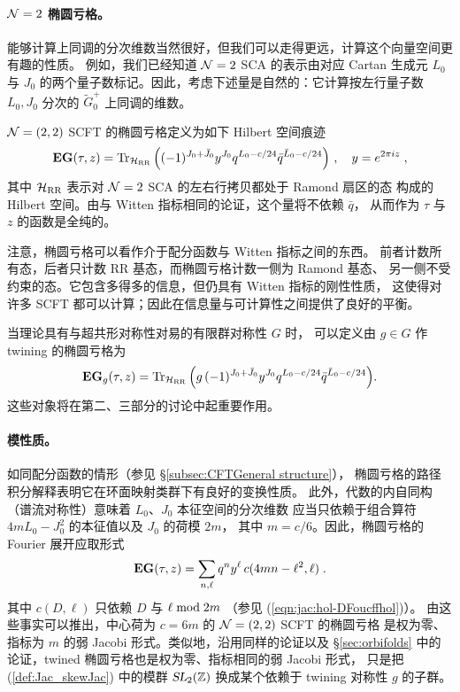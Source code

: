 \documentclass[11pt,a4paper,fontset=windows]{ctexart}
\numberwithin{equation}{section}
\newcommand{\SL}{\operatorname{\textsl{SL}}}      %
\newcommand{\myparagraph}[1]{\paragraph{#1}\mbox\\}
\newcommand{\ZZ}{\mathbb{Z}}
\newcommand{\xmod}{{\rm \;mod\;}}
\def\p{\pi}
\def\t{\tau}
\def\til{\tilde}
\def\Tr{\tr}
\newcommand{\tr}{\operatorname{Tr}}
\newcommand{\be}{\begin{equation}}
\newcommand{\ee}{\end{equation}}
\newcommand{\eq}[1]{(\ref{#1})}
\begin{document}
\myparagraph{${\cal N}=2$ 椭圆亏格。}
能够计算上同调的分次维数当然很好，但我们可以走得更远，计算这个向量空间更有趣的性质。
例如，我们已经知道 ${\cal N}=2$ SCA 的表示由对应 Cartan 生成元 $L_0$ 与 $J_0$
的两个量子数标记。因此，考虑下述量是自然的：它计算按左行量子数 $L_0,J_0$
分次的 $\til G_0^+$ 上同调的维数。

${\cal N}=(2,2)$ SCFT 的椭圆亏格定义为如下 Hilbert 空间痕迹
\be\label{elliptic_genus}
 {\bf EG}(\t,z) = \Tr_{{ \cal H}_{\text {RR}}}\Big( (-1)^{J_0+\bar J_0} y^{J_0} q^{L_0-c/24}\bar q^{\bar L_0-c/24}  \Big) \ ,\quad y= e^{2\p i z} \;,
\ee
其中 ${ \cal H}_{\text {RR}}$ 表示对 ${\cal N}=2$ SCA 的左右行拷贝都处于 Ramond 扇区的态
构成的 Hilbert 空间。由与 Witten 指标相同的论证，这个量将不依赖 $\bar q$，
从而作为 $\tau$ 与 $z$ 的函数是全纯的。


注意，椭圆亏格可以看作介于配分函数与 Witten 指标之间的东西。
前者计数所有态，后者只计数 RR 基态，而椭圆亏格计数一侧为 Ramond 基态、
另一侧不受约束的态。它包含多得多的信息，但仍具有 Witten 指标的刚性性质，
这使得对许多 SCFT 都可以计算；因此在信息量与可计算性之间提供了良好的平衡。

当理论具有与超共形对称性对易的有限群对称性 $G$ 时，
可以定义由 $g\in G$ 作 twining 的椭圆亏格为
\be\label{def:twined_elliptic_genus}
 {\bf EG}_g(\t,z) = \Tr_{{ \cal H}_{\text {RR}}}\Big(g\, (-1)^{J_0+\bar J_0} y^{J_0} q^{L_0-c/24}\bar q^{\bar L_0-c/24}  \Big) .
\ee
这些对象将在第二、三部分的讨论中起重要作用。


\myparagraph{模性质。}
如同配分函数的情形（参见 \S\ref{subsec:CFTGeneral structure}），
椭圆亏格的路径积分解释表明它在环面映射类群下有良好的变换性质。
此外，代数的内自同构（谱流对称性）意味着 $L_0$、$J_0$ 本征空间的分次维数
应当只依赖于组合算符 $4mL_0 -J_0^2$ 的本征值以及 $J_0$ 的荷模 $2m$，
其中 $m=c/6$。因此，椭圆亏格的 Fourier 展开应取形式
$$
{\bf EG}(\t,z) = \sum_{n,\ell} q^n y^\ell \,c(4mn-\ell^2,\ell) \;.
$$
其中 $c(D,\ell)$ 只依赖 $D$ 与 $\ell \xmod 2m$
（参见 \eq{eqn:jac:hol-DFoucffhol}）。
由这些事实可以推出，中心荷为 $c=6m$ 的 ${\cal N}=(2,2)$ SCFT 的椭圆亏格
是权为零、指标为 $m$ 的弱 Jacobi 形式。类似地，沿用同样的论证以及
\S\ref{sec:orbifolds} 中的论证，twined 椭圆亏格也是权为零、指标相同的弱 Jacobi 形式，
只是把 \eq{def:Jac_skewJac} 中的模群 $\SL_2(\ZZ)$ 换成某个依赖于 twining 对称性 $g$ 的子群。
\end{document}
